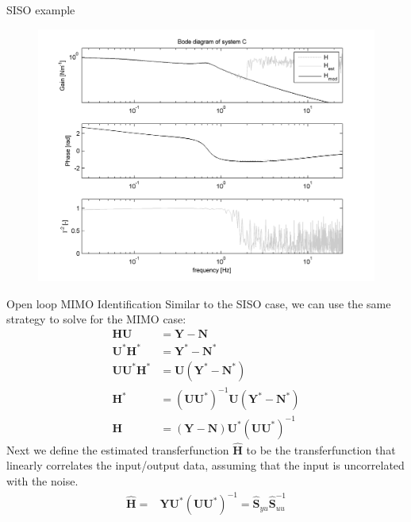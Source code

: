 \documentclass{beamer}
\begin{document}
\begin{frame}{SISO example}
\begin{figure}
\includegraphics[scale=0.6]{images/SISObode}
\end{figure}
\end{frame}

\begin{frame}{Open loop MIMO Identification}
		Similar to the SISO case, we can use the same strategy to solve for the MIMO case:
		\begin{align}
				\mathbf{H}\mathbf{U} & = \mathbf{Y}-\mathbf{N}  \nonumber \\
				\mathbf{U}^\ast\mathbf{H}^\ast & = \mathbf{Y}^\ast-\mathbf{N} ^\ast \nonumber \\
					\mathbf{U}\mathbf{U}^\ast\mathbf{H}^\ast & = 	\mathbf{U}\left(\mathbf{Y}^*-\mathbf{N} ^\ast\right) \nonumber \\
					\mathbf{H}^\ast & = 	\left(\mathbf{U}\mathbf{U}^\ast\right)^{-1}\mathbf{U}\left(\mathbf{Y}^\ast-\mathbf{N} ^\ast\right) \nonumber \\
								\mathbf{H} & = 	\left(\mathbf{Y}-\mathbf{N}\right)\mathbf{U}^\ast\left(\mathbf{U}\mathbf{U}^\ast\right)^{-1} 
		\end{align}
Next we define the estimated transferfunction $\hat{\mathbf{H}}$ to be the transferfunction that linearly correlates the input/output data, assuming that the input is uncorrelated with the noise.
	\begin{align}
				\hat{\mathbf{H}} 	= & \mathbf{Y}\mathbf{U}^\ast\left(\mathbf{U}\mathbf{U}^\ast\right)^{-1} =  \hat{\mathbf{S}}_{yu}\hat{\mathbf{S}}_{uu}^{-1}
	\end{align}
\end{frame}
\end{document}
